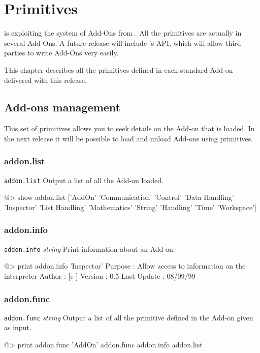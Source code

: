 \chapter{Primitives}

\squirrel is exploiting the system of Add-Ons from \beos. All the primitives are actually in several Add-Ons. A future release will include \squirrel's API, which will allow third parties to write Add-Ons very easily. 
 
This chapter describes all the primitives defined in each standard Add-on delivered with this release.

\section{Add-ons management} 
 
This set of primitives allows you to seek details on the Add-on that is loaded. In the next release it will 
be possible to load and unload Add-ons using primitives. 
 
\subsection*{addon.list}
 
{\tt addon.list}
\newline\newline
Output a list of all the Add-on loaded. 
\begin{verbatimtab}
@> show addon.list 
['AddOn' 'Communication' 'Control' 'Data Handling' 'Inspector'
'List Handling' 'Mathematics' 'String' 'Handling' 'Time' 'Workspace'] 
\end{verbatimtab}
 
\subsection*{addon.info}  
 
{\tt addon.info} {\it string} 
\newline\newline 
Print information about an Add-on. 
\begin{verbatimtab} 
@> print addon.info 'Inspector' 
Purpose     : Allow access to information on the interpreter 
Author      : [e-] 
Version     : 0.5 
Last Update : 08/09/99 
\end{verbatimtab}
 
\subsection*{addon.func}  
 
{\tt addon.func} {\it string} 
\newline\newline 
Output a list of all the primitive defined in the Add-on given as input. 
\begin{verbatimtab} 
@> print addon.func 'AddOn' 
addon.func addon.info addon.list  
\end{verbatimtab}
